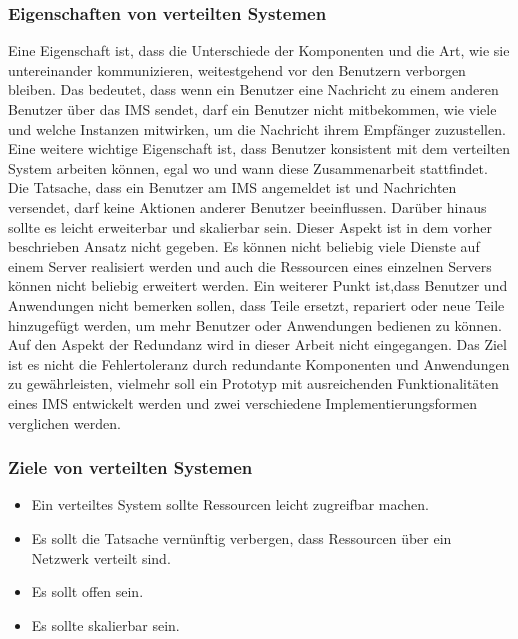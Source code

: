 \documentclass[a4paper,titlepage,halfparskip,12pt]{scrreprt}
\begin{document}
\begin{onehalfspacing}
\subsubsection*{Eigenschaften von verteilten Systemen}

Eine Eigenschaft ist, dass die Unterschiede der Komponenten und die Art, wie sie untereinander kommunizieren, weitestgehend vor den Benutzern verborgen bleiben. Das bedeutet, dass wenn ein Benutzer eine Nachricht zu einem anderen Benutzer über das \ac{IMS} sendet, darf ein Benutzer nicht mitbekommen, wie viele und welche Instanzen mitwirken, um die Nachricht ihrem Empfänger zuzustellen. Eine weitere wichtige Eigenschaft ist, dass Benutzer konsistent mit dem verteilten System arbeiten können, egal wo und wann diese Zusammenarbeit stattfindet. Die Tatsache, dass ein Benutzer am \ac{IMS} angemeldet ist und Nachrichten versendet, darf keine Aktionen anderer Benutzer beeinflussen. Darüber hinaus sollte es leicht erweiterbar und skalierbar sein. Dieser Aspekt ist in dem vorher beschrieben Ansatz nicht gegeben. Es können nicht beliebig viele Dienste auf einem Server realisiert werden und auch die Ressourcen eines einzelnen Servers können nicht beliebig erweitert werden. Ein weiterer Punkt ist,dass Benutzer und Anwendungen nicht bemerken sollen, dass Teile ersetzt, repariert oder neue Teile hinzugefügt werden, um mehr Benutzer oder Anwendungen bedienen zu können.\cite{andrew2008verteilte}
Auf den Aspekt der Redundanz wird in dieser Arbeit nicht eingegangen. Das Ziel ist es nicht die Fehlertoleranz durch redundante Komponenten und Anwendungen zu gewährleisten, vielmehr soll ein Prototyp mit ausreichenden Funktionalitäten eines \ac{IMS} entwickelt werden und zwei verschiedene Implementierungsformen verglichen werden.

\subsubsection*{Ziele von verteilten Systemen \cite{andrew2008verteilte}}

\begin{itemize}
\item Ein verteiltes System sollte Ressourcen leicht zugreifbar machen.
\item Es sollt die Tatsache vernünftig verbergen, dass Ressourcen über ein Netzwerk verteilt sind.
\item Es sollt offen sein.
\item Es sollte skalierbar sein.
\end{itemize}


\end{onehalfspacing}
\end{document}

